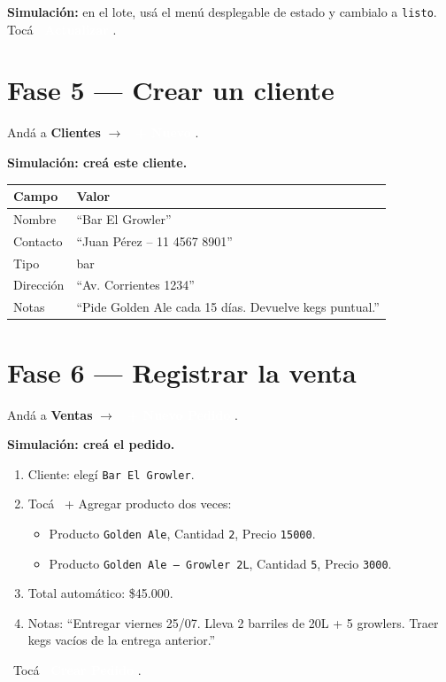 \documentclass[11pt,a4paper]{report}
\newcommand{\appbtn}[1]{%
  \textcolor{white}{\colorbox{beer}{\footnotesize\sffamily\bfseries\ #1}}%
}
\newcommand{\appbtnsec}[1]{%
  \colorbox{black!10}{\footnotesize\sffamily\ #1}%
}
\begin{document}
\begin{simbox}
\textbf{Simulación:} en el lote, usá el menú desplegable de estado y cambialo a \texttt{listo}. Tocá \appbtn{Actualizar}.
\end{simbox}

\section{Fase 5 — Crear un cliente}

Andá a \textbf{Clientes} $\to$ \appbtn{+ Nuevo}.

\begin{simbox}
\textbf{Simulación: creá este cliente.}

\begin{tabular}{ll}
\toprule
\textbf{Campo} & \textbf{Valor} \\
\midrule
Nombre    & ``Bar El Growler'' \\
Contacto  & ``Juan Pérez -- 11 4567 8901'' \\
Tipo      & bar \\
Dirección & ``Av. Corrientes 1234'' \\
Notas     & ``Pide Golden Ale cada 15 días. Devuelve kegs puntual.'' \\
\bottomrule
\end{tabular}
\end{simbox}

\section{Fase 6 — Registrar la venta}

Andá a \textbf{Ventas} $\to$ \appbtn{+ Nuevo Pedido}.

\begin{simbox}
\textbf{Simulación: creá el pedido.}

\begin{enumerate}[leftmargin=*]
  \item Cliente: elegí \texttt{Bar El Growler}.
  \item Tocá \appbtnsec{+ Agregar producto} dos veces:
  \begin{itemize}
    \item Producto \texttt{Golden Ale}, Cantidad \texttt{2}, Precio \texttt{15000}.
    \item Producto \texttt{Golden Ale -- Growler 2L}, Cantidad \texttt{5}, Precio \texttt{3000}.
  \end{itemize}
  \item Total automático: \$45.000.
  \item Notas: ``Entregar viernes 25/07. Lleva 2 barriles de 20L + 5 growlers. Traer kegs vacíos de la entrega anterior.''
\end{enumerate}

\medskip
\textcolor{accent}{\faArrowRight\ Tocá \appbtn{Crear Pedido}.}
\end{simbox}
\end{document}
